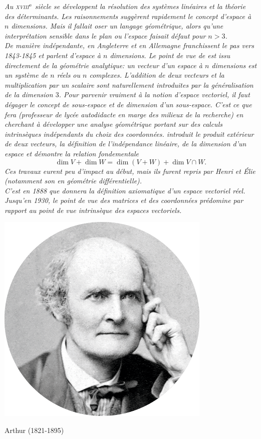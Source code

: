 \textsl{Au \textsc{xviii}$^{\mathrm{e}}$ siècle se développent la résolution des systèmes linéaires et la théorie des déterminants. Les raisonnements suggèrent rapidement le concept d'espace à $n$ dimensions. Mais il fallait oser un langage géométrique, alors qu'une interprétation sensible dans le plan ou l'espace faisait défaut pour $n > 3$. \\
De manière indépendante,  en Angleterre et  en Allemagne franchissent le pas vers 1843-1845 et parlent d'espace à $n$ dimensions. Le point de vue de  est issu directement de la géométrie analytique: un vecteur d'un espace à $n$ dimensions est un système de $n$ réels ou $n$ complexes. L'addition de deux vecteurs et la multiplication par un scalaire sont naturellement introduites par la généralisation de la dimension $3$. Pour parvenir vraiment à la notion d'espace vectoriel, il faut dégager le concept de sous-espace et de dimension d'un sous-espace. C'est ce que fera  (professeur de lycée autodidacte en marge des milieux de la recherche) en cherchant à développer une analyse géométrique portant sur des calculs intrinsèques indépendants du choix des coordonnées.  introduit le produit extérieur de deux vecteurs, la définition de l'indépendance linéaire, de la dimension d'un espace et démontre la relation fondementale
$$\dim V + \dim W = \dim (V + W) + \dim V \cap W.$$
Ces travaux eurent peu d'impact au début, mais ils furent repris par Henri  et Élie  (notamment son  en géométrie différentielle). \\
C'est en 1888 que  donnera la définition axiomatique d'un espace vectoriel réel. Jusqu'en 1930, le point de vue des matrices et des coordonnées prédomine par rapport au point de vue intrinsèque des espaces vectoriels.
}

\begin{marginfigure}[-10cm]
    \centering
    \includegraphics{images/arthur_cayley.png}
    \caption*{\centering Arthur  (1821-1895)}
\end{marginfigure}

